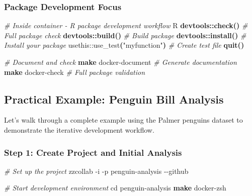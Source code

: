 \documentclass[
]{article}
\newenvironment{Shaded}{\begin{snugshade}}{\end{snugshade}}
\newcommand{\AttributeTok}[1]{\textcolor[rgb]{0.13,0.29,0.53}{#1}}
\newcommand{\BuiltInTok}[1]{#1}
\newcommand{\CommentTok}[1]{\textcolor[rgb]{0.56,0.35,0.01}{\textit{#1}}}
\newcommand{\ErrorTok}[1]{\textcolor[rgb]{0.64,0.00,0.00}{\textbf{#1}}}
\newcommand{\ExtensionTok}[1]{#1}
\newcommand{\FunctionTok}[1]{\textcolor[rgb]{0.13,0.29,0.53}{\textbf{#1}}}
\newcommand{\KeywordTok}[1]{\textcolor[rgb]{0.13,0.29,0.53}{\textbf{#1}}}
\newcommand{\NormalTok}[1]{#1}
\newcommand{\StringTok}[1]{\textcolor[rgb]{0.31,0.60,0.02}{#1}}
\begin{document}
\subsubsection{Package Development
Focus}\label{package-development-focus}

\begin{Shaded}
\begin{Highlighting}[]
\CommentTok{\# Inside container {-} R package development workflow}
\ExtensionTok{R}
\FunctionTok{devtools::check()}            \CommentTok{\# Full package check}
\FunctionTok{devtools::build()}            \CommentTok{\# Build package}
\FunctionTok{devtools::install()}          \CommentTok{\# Install your package}
\ExtensionTok{usethis::use\_test}\ErrorTok{(}\StringTok{"myfunction"}\KeywordTok{)}  \CommentTok{\# Create test file}
\FunctionTok{quit()}

\CommentTok{\# Document and check}
\FunctionTok{make}\NormalTok{ docker{-}document         }\CommentTok{\# Generate documentation}
\FunctionTok{make}\NormalTok{ docker{-}check           }\CommentTok{\# Full package validation}
\end{Highlighting}
\end{Shaded}

\subsection{Practical Example: Penguin Bill
Analysis}\label{practical-example-penguin-bill-analysis}

Let's walk through a complete example using the Palmer penguins dataset
to demonstrate the iterative development workflow.

\subsubsection{Step 1: Create Project and Initial
Analysis}\label{step-1-create-project-and-initial-analysis}

\begin{Shaded}
\begin{Highlighting}[]
\CommentTok{\# Set up the project}
\ExtensionTok{zzcollab} \AttributeTok{{-}i} \AttributeTok{{-}p}\NormalTok{ penguin{-}analysis }\AttributeTok{{-}{-}github}

\CommentTok{\# Start development environment}
\BuiltInTok{cd}\NormalTok{ penguin{-}analysis}
\FunctionTok{make}\NormalTok{ docker{-}zsh}
\end{Highlighting}
\end{Shaded}
\end{document}
